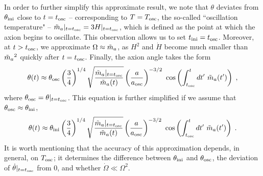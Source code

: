 \documentclass[11pt,a4paper]{article}
\begin{document}
In order to further simplify this approximate result, we note that $\theta$ deviates from $\theta_{\rm ini}{}$ close to $t=t_{\rm osc}{}$ -- corresponding to $T = T_{\rm osc}{}$, the so-called ``oscillation temperature" -- $\tilde m_{a}{}|_{t = t_{\rm osc}{}} = 3 H|_{t = t_{\rm osc}{}}$, which is defined as the point at which the axion begins to oscillate. 
%
This observation allows us to set $t_{\rm ini}{} = t_{\rm osc}{}$.  Moreover, at $t > t_{\rm osc}{}$, we approximate $\Omega \approx \tilde m_{a}{}$, as $H^2$ and $\dot H$ become much smaller than $\tilde m_{a}{}^2$ quickly after $t=t_{\rm osc}{}$. Finally, the axion angle takes the form
%
\begin{equation}
	\theta(t) \approx \theta_{\rm osc}{} \left( \dfrac{3}{4} \right)^{1/4} \sqrt{ \dfrac{ \tilde m_{a}{}|_{t=t_{\rm osc}{}} }{\tilde m_{a}{}  (t)} } \left( \dfrac{a}{a_{\rm osc}{}} \right)^{-3/2} \  \cos\left(  \int_{t_{\rm osc}{}}^t d t^\prime  \ \tilde m_{a}{}(t^\prime) \right)   \;,
	\label{eq:solution_eom_approx_theta_osc} 
\end{equation}
%
where $\theta_{\rm osc}{} = \theta|_{t=t_{\rm osc}{}}$. This equation is further simplified if we assume that $\theta_{\rm osc}{} \approx \theta_{\rm ini}{}$, \ie
%
\begin{equation}
	\theta(t) \approx \thetai \lrb{\dfrac{3}{4}}^{1/4} \sqrt{ \dfrac{ \maT|_{t=\tosc} }{\maT  (t)} } \lrb{\dfrac{a}{\aosc}}^{-3/2} \  \cos\lrb{ \int_{\tosc}^t d t^\prime  \ \maT(t^\prime)}   \;.
	\label{eq:solution_eom_approx_final} 
\end{equation}
%
It is worth mentioning that the accuracy of this approximation depends, in general, on $T_{\rm osc}{}$; it determines the difference between $\theta_{\rm ini}{}$ and $\theta_{\rm osc}{}$, the deviation of $\dot \theta|_{t=t_{\rm osc}{}}$ from $0$, and whether $\dot \Omega \ll \Omega^2$. 
\end{document}

